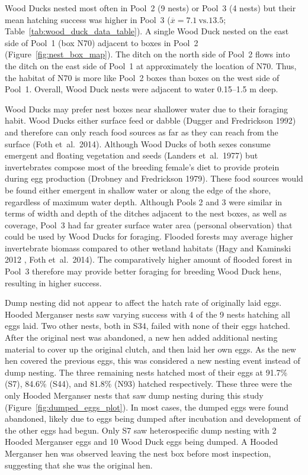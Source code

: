 Wood Ducks nested most often in Pool~2 (9 nests) or Pool~3 (4 nests) but their mean hatching success was higher in Pool~3 ($\overline{x} = 7.1~\mathrm{vs.} 13.5$; Table~\ref{tab:wood_duck_data_table}).  A single Wood Duck nested on the east side of Pool~1 (box N70) adjacent to boxes in Pool~2 (Figure~\ref{fig:nest_box_map}). The ditch on the north side of Pool~2 flows into the ditch on the east side of Pool~1 at approximately the location of N70. Thus, the habitat of N70 is more like Pool~2 boxes than boxes on the west side of Pool~1. Overall, Wood Duck nests were adjacent to water 0.15–1.5 m deep.   



Wood Ducks may prefer nest boxes near shallower water due to their foraging habit. Wood Ducks either surface feed or dabble (Dugger and Fredrickson 1992) and therefore can only reach food sources as far as they can reach from the surface (Foth et~al.~2014). Although Wood Ducks of both sexes consume emergent and floating vegetation and seeds (Landers et~al.~1977) but invertebrates compose most of the breeding female’s diet to provide protein during egg production (Drobney and Fredrickson 1979). These food sources would be found either emergent in shallow water or along the edge of the shore, regardless of maximum water depth. Although Pools 2 and 3 were similar in terms of width and depth of the ditches adjacent to the nest boxes, as well as coverage, Pool~3 had far greater surface water area (personal observation) that could be used by Wood Ducks for foraging. Flooded forests may average higher invertebrate biomass compared to other wetland habitats (Hagy and Kaminski 2012 , Foth et~al.~2014). The comparatively higher amount of flooded forest in Pool~3 therefore may provide better foraging for breeding Wood Duck hens, resulting in higher success.  

Dump nesting did not appear to affect the hatch rate of originally laid eggs. Hooded Merganser nests saw varying success with 4 of the 9 nests hatching all eggs laid. Two other nests, both in S34, failed with none of their eggs hatched. After the original nest was abandoned, a new hen added additional nesting material to cover up the original clutch, and then laid her own eggs. As the new hen covered the previous eggs, this was considered a new nesting event instead of dump nesting. The three remaining nests hatched most of their eggs at 91.7\% (S7), 84.6\% (S44), and 81.8\% (N93) hatched respectively. These three were the only Hooded Merganser nests that saw dump nesting during this study (Figure~\ref{fig:dumped_eggs_plot}). In most cases, the dumped eggs were found abandoned, likely due to eggs being dumped after incubation and development of the other eggs had begun. Only S7 saw heterospecific dump nesting with 2 Hooded Merganser eggs and 10 Wood Duck eggs being dumped. A Hooded Merganser hen was observed leaving the nest box before most inspection, suggesting that she was the original hen.  

